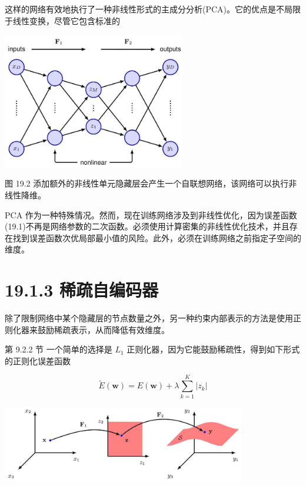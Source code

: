 \documentclass[10pt]{report}
\begin{document}
这样的网络有效地执行了一种非线性形式的主成分分析(PCA)。它的优点是不局限于线性变换，尽管它包含标准的

\begin{center}
\includegraphics[max width=0.6\textwidth]{images/0194e279-9b28-703a-88f4-c3ac21e2010d_585_792_349_750_557_0.jpg}
\end{center}
\hspace*{3em} 

图 19.2 添加额外的非线性单元隐藏层会产生一个自联想网络，该网络可以执行非线性降维。

PCA 作为一种特殊情况。然而，现在训练网络涉及到非线性优化，因为误差函数(19.1)不再是网络参数的二次函数。必须使用计算密集的非线性优化技术，并且存在找到误差函数次优局部最小值的风险。此外，必须在训练网络之前指定子空间的维度。

\section*{19.1.3 稀疏自编码器}

除了限制网络中某个隐藏层的节点数量之外，另一种约束内部表示的方法是使用正则化器来鼓励稀疏表示，从而降低有效维度。

第 9.2.2 节 一个简单的选择是 \({L}_{1}\) 正则化器，因为它能鼓励稀疏性，得到如下形式的正则化误差函数

\[
\widetilde{E}\left( \mathbf{w}\right)  = E\left( \mathbf{w}\right)  + \lambda \mathop{\sum }\limits_{{k = 1}}^{K}\left| {z}_{k}\right|  \tag{19.2}
\]

\begin{center}
\includegraphics[max width=0.8\textwidth]{images/0194e279-9b28-703a-88f4-c3ac21e2010d_585_415_1466_1085_343_0.jpg}
\end{center}
\hspace*{3em} 
\end{document}
